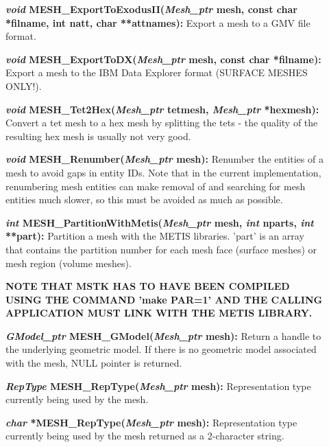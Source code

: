 \documentclass[12pt]{article}
\begin{document}
\begin{description}
\item[]{\bf {\em void} MESH\_ExportToExodusII({\em Mesh\_ptr} mesh,
    const char *filname, int natt, char **attnames):} Export a mesh to
  a GMV file format.

\item[]{\bf {\em void} MESH\_ExportToDX({\em Mesh\_ptr} mesh, const
    char *filname):} Export a mesh to the IBM Data Explorer format
  (SURFACE MESHES ONLY!).

\item[]{\bf {\em void} MESH\_Tet2Hex({\em Mesh\_ptr} tetmesh, {\em
      Mesh\_ptr} *hexmesh):} Convert a tet mesh to a hex mesh by
  splitting the tets - the quality of the resulting hex mesh is
  usually not very good.

\item[]{\bf {\em void} MESH\_Renumber({\em Mesh\_ptr} mesh):} Renumber
  the entities of a mesh to avoid gaps in entity IDs. Note that in the
  current implementation, renumbering mesh entities can make removal
  of and searching for mesh entities much slower, so this must be
  avoided as much as possible.

\item[]{\bf {\em int} MESH\_PartitionWithMetis({\em Mesh\_ptr} mesh,
    {\em int} nparts, {\em int} **part):} Partition a mesh with the
  METIS libraries. 'part' is an array that contains the partition
  number for each mesh face (surface meshes) or mesh region (volume
  meshes). 

  \par {\bf NOTE THAT MSTK HAS TO HAVE BEEN COMPILED USING THE COMMAND
    'make PAR=1' AND THE CALLING APPLICATION MUST LINK WITH THE METIS
    LIBRARY.}

\item[]

\item[]{\bf {\em GModel\_ptr} MESH\_GModel({\em Mesh\_ptr} mesh):}
Return a handle to the underlying geometric model. If there is no
geometric model associated with the mesh, NULL pointer is returned.

\item[]{\bf {\em RepType} MESH\_RepType({\em Mesh\_ptr} mesh):}
Representation type currently being used by the mesh.

\item[]{\bf {\em char } *MESH\_RepType({\em Mesh\_ptr} mesh):}
  Representation type currently being used by the mesh returned as a
  2-character string.

\item[]


\end{description}
\end{document}
